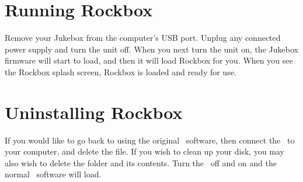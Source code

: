 \section{Running Rockbox}
Remove your Jukebox from the computer's USB port. Unplug any connected power
supply and turn the unit off. When you next turn the unit on, the Jukebox
firmware will start to load, and then it will load Rockbox for you. When you see
the Rockbox splash screen, Rockbox is loaded and ready for use.

\section{Uninstalling Rockbox}
If you would like to go back to using the original \playername\ software, then
connect the \playername\ to your computer, and delete the
\fname{\firmwarefilename} file. If you wish to clean up your disk, you may also
wish to delete the  folder and its contents. Turn the
\playername\ off and on and the normal \playername\ software will load.
